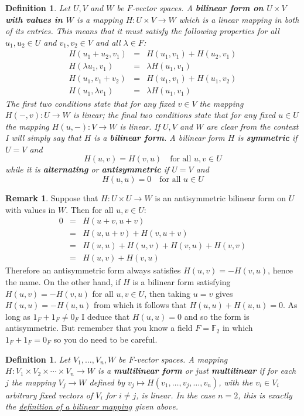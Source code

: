 \documentclass[11pt]{amsbook}
\newtheorem{definition}[theorem]{Definition}
\theoremstyle{definition}
\newtheorem{rem}[theorem]{Remark}
\begin{document}
\begin{definition} \label{bilindef} Let $U,V$ and $W$ be $F$-vector spaces. A {\bf bilinear form on $U\times V$ with values in $W$} is a mapping $H: U\times V \to W$ which is a linear mapping in both of its entries. This means that it must satisfy the following properties for all $u_1, u_2\in U$ and $v_1, v_2 \in V$ and all $\lambda \in F$:
\begin{eqnarray*}
 H(u_1+u_2, v_1) &=& H(u_1, v_1) + H(u_2,v_1) \\
H(\lambda u_1, v_1) &=& \lambda H(u_1, v_1) \\
H(u_1, v_1+v_2) &=& H(u_1,v_1) + H(u_1,v_2) \\
H(u_1, \lambda v_1) &=& \lambda H(u_1, v_1)
\end{eqnarray*}
The first two conditions state that for any fixed $v\in V$ the mapping $H(-, v): U\to W$ is linear; the final two conditions state that for any fixed $u\in U$ the mapping $H(u, -): V\to W$ is linear. If $U,V$ and $W$ are clear from the context I will simply say that $H$ is a {\bf bilinear form}. A bilinear form $H$ is {\bf symmetric} if $U=V$ and $$H(u,v) = H(v,u) \quad \text{for all $u,v \in U$} $$ while it is {\bf alternating} or {\bf antisymmetric} if $U=V$ and $$H(u,u) = 0\quad \text{for all $u\in U$} $$
\end{definition}

\begin{rem}
Suppose that $H: U\times U\to W$ is an antisymmetric bilinear form on $U$ with values in $W$. Then for all $u,v\in U$: \begin{eqnarray*}
0 & = & H(u+v, u+v) \\ & = & H(u,u+v) + H(v, u+v) \\ & = & H(u,u) + H(u,v) + H(v,u) + H(v,v) \\ & = & H(u,v) + H(v,u)
\end{eqnarray*} Therefore an antisymmetric form always satisfies $H(u,v) = -H(v,u)$, hence the name.   On the other hand, if $H$ is a bilinear form satisfying $H(u,v) = - H(v,u)$ for all $u,v\in U$, then taking $u=v$ gives $H(u,u) = -H(u,u)$ from which it follows that $H(u,u) + H(u,u) = 0$. As long as $1_F + 1_F \neq 0_F$ I deduce that $H(u,u)=0$ and so the form is antisymmetric. But remember that you know a field $F = \mathbb{F}_2$ in which $1_F + 1_F = 0_F$ so you do need to be careful.
\end{rem}

\begin{definition}
Let $V_1, \ldots , V_n, W$ be $F$-vector spaces. A mapping $H: V_1\times V_2\times \cdots \times V_n \to W$ is a {\bf multilinear form} or just {\bf multilinear} if for each $j$ the mapping $V_j \to W$ defined by $v_j \mapsto H(v_1, \ldots , v_j, \ldots , v_n)$, with the $v_i\in V_i$ arbitrary fixed vectors of $V_i$ for $i\neq j$,  is linear. In the case $n=2$, this is exactly the \hyperref[bilindef]{definition of a bilinear mapping} given above.
\end{definition}
\end{document}
